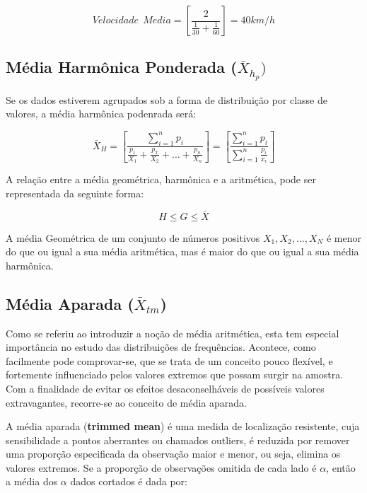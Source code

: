\begin{equation}\label{exemplo_harmonica}
Velocidade \ \  Media = \left[\frac{2}{\frac{1}{30}+\frac{1}{60}} \right ]= 40 km/h
\end{equation}


\subsection{Média Harmônica Ponderada ($\bar{X}_{h_{p}})$}


Se os dados estiverem agrupados sob a forma de distribuição por classe de valores, a média harmônica podenrada será:


\begin{equation}\label{harmonicapondrada}
    \bar{X}_{H}= \left[  \frac{\sum_{i=1}^{n}p_{i}}{\frac{p_{1}}{X_{1}}+\frac{p_{2}}{X_{2}}+\ldots+\frac{p_{n}}{X_{n}}}\right ] = \left[  \frac{\sum_{i=1}^{n}p_{i}}{\sum_{i=1}^{n}\frac{p_{i}}{x_{i}}} \right ]
\end{equation}


A relação entre a média geométrica, harmônica e a aritmética, pode ser representada da seguinte forma:

$$ H \leq G \leq \bar{X}  $$

A média Geométrica de um conjunto de números positivos $X_{1},X_{2},\ldots,X_{N}$ é menor do que ou igual a sua média aritmética, mas é maior do que ou igual a sua média harmônica.


\newpage
\subsection{Média Aparada ($\bar{X}_{tm}$)}

Como se referiu ao introduzir a noção de média aritmética, esta tem especial
importância no estudo das distribuições de frequências.
Acontece, como facilmente pode comprovar-se, que se trata de um conceito
pouco flexível, e fortemente influenciado pelos valores extremos que possam surgir na
amostra. Com a finalidade de evitar os efeitos desaconselháveis de possíveis valores
extravagantes, recorre-se ao conceito de média aparada. \vskip0.3cm


A média aparada (\textbf{trimmed mean}) é uma medida de localização resistente, cuja sensibilidade a pontos aberrantes ou chamados outliers, é reduzida por remover uma proporção especificada da observação maior e menor, ou seja, elimina os valores extremos. Se a proporção de observações omitida de cada lado é $\alpha$, então a média dos $\alpha$ dados cortados é dada por:

